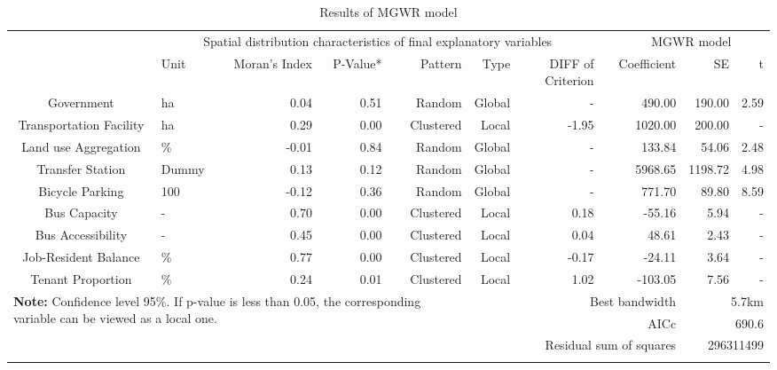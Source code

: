 \begin{sidewaystable}[htbp]
	\centering
	\caption{Results of MGWR model}
	\label{tab:chp2:ResultMGWR}
	\small
	\renewcommand{\arraystretch}{1.25} %
	
	\begin{tabular}{clrrrrrrrrr}
		\Xhline{1.5pt}
		\multicolumn{1}{c}{\multirow{2}[4]{*}{Variable}} & \multicolumn{6}{c}{Spatial distribution characteristics of final explanatory variables} & & \multicolumn{3}{c}{MGWR model} \\
		
		\cmidrule{2-7}\cmidrule{9-11}
		
		& \multicolumn{1}{p{3em}}{Unit} & \multicolumn{1}{p{4em}}{Moran's Index} & P-Value* & Pattern & Type & \multicolumn{1}{p{4em}}{DIFF of Criterion} & & Coefficient & SE & t \\
		
		\cmidrule{1-7}\cmidrule{9-11}
		
		Government & ha & 0.04 & 0.51 & Random & Global &- & & 490.00 & 190.00 & 2.59 \\
		Transportation Facility & ha & 0.29 & 0.00 & Clustered & Local & -1.95 & & 1020.00 & 200.00 & - \\
		Land use Aggregation & \% & -0.01 & 0.84 & Random & Global & - & & 133.84 & 54.06 & 2.48 \\
		Transfer Station & Dummy & 0.13 & 0.12 & Random & Global & - & & 5968.65 & 1198.72 & 4.98 \\
		Bicycle Parking & 100 & -0.12 & 0.36 & Random & Global & - & & 771.70 & 89.80 & 8.59 \\
		Bus Capacity & - & 0.70 & 0.00 & Clustered & Local & 0.18  & & -55.16 & 5.94  & - \\
		Bus Accessibility & - & 0.45 & 0.00 &  Clustered & Local & 0.04 & & 48.61 & 2.43 & - \\
		Job-Resident Balance & \% & 0.77 & 0.00 & Clustered & Local & -0.17 & & -24.11 & 3.64 & - \\
		Tenant Proportion & \% & 0.24 & 0.01 & Clustered & Local & 1.02 & & -103.05 & 7.56 & - \\
		
		\midrule
		
		\multicolumn{5}{l}{\multirow{3}[2]{30em}{\textbf{Note:} Confidence level 95\%. If p-value is less than 0.05, the corresponding variable can be viewed as a local one.}} & \multicolumn{4}{r}{Best bandwidth} & \multicolumn{2}{r}{5.7km} \\
		\multicolumn{5}{l}{} & \multicolumn{4}{r}{AICc} & \multicolumn{2}{r}{690.6} \\
		\multicolumn{5}{l}{} & \multicolumn{4}{r}{Residual sum of squares} & \multicolumn{2}{r}{296311499} \\
		
		\Xhline{1.5pt}
	\end{tabular}%
\end{sidewaystable}%


